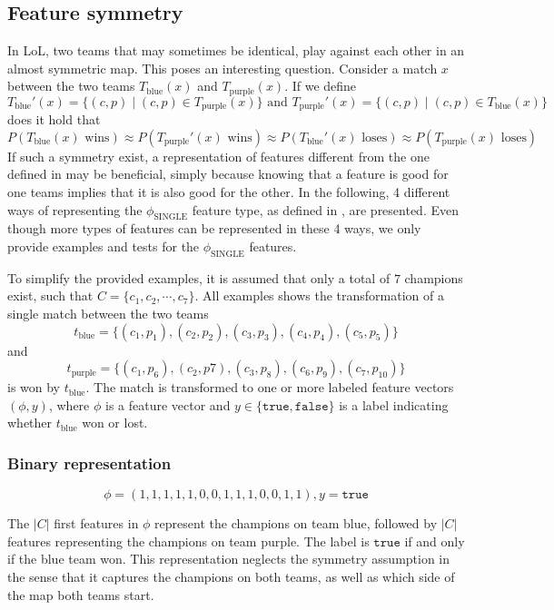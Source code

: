 \subsection{Feature symmetry}
\label{sec:representationoffeatures}
In LoL, two teams that may sometimes be identical, play against each other in an almost symmetric map.
This poses an interesting question.
Consider a match $x$ between the two teams $T_\text{blue}(x)$ and $T_\text{purple}(x)$.
If we define 
\[T_\text{blue}'(x) = \{(c,p) \mid (c,p) \in T_\text{purple}(x)\} \text{ and } T_\text{purple}'(x) = \{(c,p) \mid (c,p) \in T_\text{blue}(x)\}\]
does it hold that 
\[P(T_\text{blue}(x) \text{ wins}) \approx P(T_\text{purple}'(x) \text{ wins}) \approx P(T_\text{blue}'(x) \text{ loses}) \approx P(T_\text{purple}(x) \text{ loses})\]
If such a symmetry exist, a representation of features different from the one defined in  may be beneficial, simply because knowing that a feature is good for one teams implies that it is also good for the other.
In the following, 4 different ways of representing the $\phi_\text{SINGLE}$ feature type, as defined in , are presented.
Even though more types of features can be represented in these 4 ways, we only provide examples and tests for the $\phi_\text{SINGLE}$ features.

To simplify the provided examples, it is assumed that only a total of $7$ champions exist, such that $C = \{c_1, c_2, \cdots, c_7\}$.
All examples shows the transformation of a single match between the two teams \[t_\text{blue} = \{(c_1, p_1), (c_2,p_2), (c_3,p_3), (c_4,p_4), (c_5, p_5)\}\] 
and 
\[t_\text{purple} = \{(c_1, p_6),(c_2,p7), (c_3,p_8),(c_6,p_9),(c_7,p_{10})\}\] 
is won by $t_\text{blue}$. The match is transformed to one or more labeled feature vectors $(\phi, y)$, where $\phi$ is a feature vector and $y \in \{\mathtt{true}, \mathtt{false}\}$ is a label indicating whether $t_\text{blue}$ won or lost.

\subsubsection{Binary representation}

\[ \phi = (1,1,1,1,1,0,0,1,1,1,0,0,1,1), y = \mathtt{true} \]

The $|C|$ first features in $\phi$ represent the champions on team blue, followed by $|C|$ features representing the champions on team purple. The label is $\mathtt{true}$ if and only if the blue team won.
This representation neglects the symmetry assumption in the sense that it captures the champions on both teams, as well as which side of the map both teams start.

